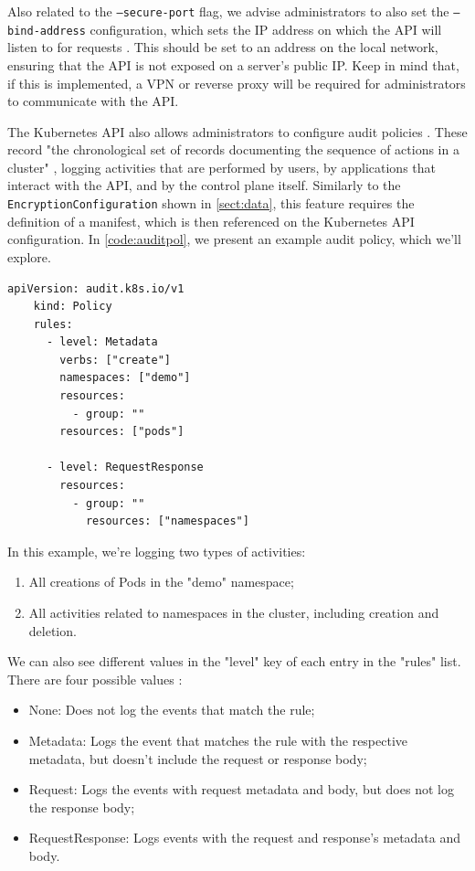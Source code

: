\documentclass[a4paper,11pt,openright,BCOR=15mm]{scrbook}
\begin{document}
Also related to the \texttt{--secure-port} flag, we advise administrators to also set the \texttt{--bind-address} configuration, which sets the IP address on which the API will listen to for requests \cite{the_linux_foundation_kube-apiserver_2024}. This should be set to an address on the local network, ensuring that the API is not exposed on a server's public IP. Keep in mind that, if this is implemented, a VPN or reverse proxy will be required for administrators to communicate with the API.

The Kubernetes API also allows administrators to configure audit policies \cite{the_linux_foundation_auditing_2024}. These record "the chronological set of records documenting the sequence of actions in a cluster" \cite{the_linux_foundation_auditing_2024}, logging activities that are performed by users, by applications that interact with the API, and by the control plane itself. Similarly to the \texttt{EncryptionConfiguration} shown in \ref{sect:data}, this feature requires the definition of a manifest, which is then referenced on the Kubernetes API configuration. In \ref{code:auditpol}, we present an example audit policy, which we'll explore.

\begin{lstlisting}[style=yaml,caption={ResourceQuota example},label=code:auditpol]
	apiVersion: audit.k8s.io/v1
	kind: Policy
	rules:
	  - level: Metadata
	    verbs: ["create"]
	    namespaces: ["demo"] 
	    resources:
	      - group: ""   
	    resources: ["pods"]
	
	  - level: RequestResponse 
	    resources:
	      - group: ""
	        resources: ["namespaces"]
\end{lstlisting}

In this example, we're logging two types of activities:
\begin{enumerate}
	\item All creations of Pods in the "demo" namespace;
	\item All activities related to namespaces in the cluster, including creation and deletion.
\end{enumerate}

We can also see different values in the "level" key of each entry in the "rules" list. There are four possible values \cite{the_linux_foundation_auditing_2024}:
\begin{itemize}
	\item None: Does not log the events that match the rule;
	\item Metadata: Logs the event that matches the rule with the respective metadata, but doesn't include the request or response body;
	\item Request: Logs the events with request metadata and body, but does not log the response body;
	\item RequestResponse: Logs events with the request and response's metadata and body.
\end{itemize}
\end{document}
